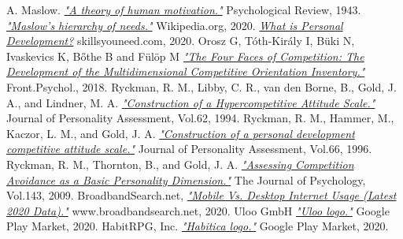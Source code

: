 \documentclass[twoside]{ctuthesis}
\begin{document}
    
    \begin{thebibliography}{99}
            A. Maslow.
            \href{http://psychclassics.yorku.ca/Maslow/motivation.htm}{\emph{"A theory of human motivation."}}
            Psychological Review, 1943.
            \href{https://en.wikipedia.org/wiki/File:Maslow's_Hierarchy_of_Needs2.svg}{\emph{"Maslow's hierarchy of needs."}}
            Wikipedia.org, 2020.
            \href{https://www.skillsyouneed.com/ps/personal-development.html}{\emph{What is Personal Development?}}
            skillsyouneed.com, 2020.
            Orosz G, Tóth-Király I, Büki N, Ivaskevics K, Bőthe B and Fülöp M
            \href{https://www.frontiersin.org/articles/10.3389/fpsyg.2018.00779/full}{\emph{"The Four Faces of Competition: The Development of the Multidimensional Competitive Orientation Inventory."}}
            Front.Psychol., 2018.
            Ryckman, R. M., Libby, C. R., van den Borne, B., Gold, J. A., and Lindner, M. A.
            \href{https://doi.org/10.1080/00223891.1990.9674097}{\emph{"Construction of a Hypercompetitive Attitude Scale."}}
            Journal of Personality Assessment, Vol.62, 1994.
            Ryckman, R. M., Hammer, M., Kaczor, L. M., and Gold, J. A.
            \href{https://doi.org/10.1207/s15327752jpa6602_15}{\emph{"Construction of a personal development competitive attitude scale."}}
            Journal of Personality Assessment, Vol.66, 1996.
         Ryckman, R. M., Thornton, B., and Gold, J. A.
            \href{https://doi.org/10.3200/JRLP.143.2.175-192}{\emph{"Assessing Competition Avoidance as a Basic Personality Dimension."}}
            The Journal of Psychology, Vol.143, 2009.
            BroadbandSearch.net,
            \href{https://www.broadbandsearch.net/blog/mobile-desktop-internet-usage-statistics}{\emph{"Mobile Vs. Desktop Internet Usage (Latest 2020 Data)."}}
            www.broadbandsearch.net, 2020.
            Uloo GmbH
            \href{https://play.google.com/store/apps/details?id=com.uloo}{\emph{"Uloo logo."}}
            Google Play Market, 2020.
         HabitRPG, Inc.
            \href{https://play.google.com/store/apps/details?id=com.habitrpg.android.habitica}{\emph{"Habitica logo."}}
            Google Play Market, 2020.

\end{thebibliography}
\end{document}
